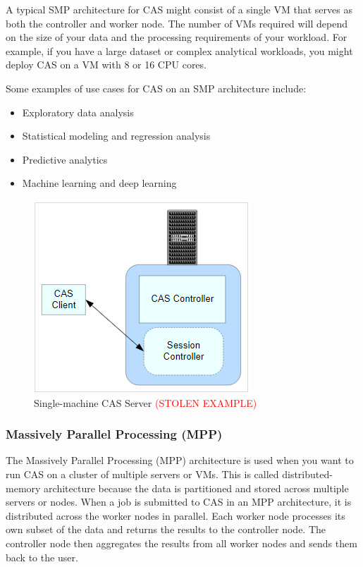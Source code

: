 A typical SMP architecture for CAS might consist of a single VM that serves as both the controller and worker node. The number of VMs required will depend on the size of your data and the processing requirements of your workload. For example, if you have a large dataset or complex analytical workloads, you might deploy CAS on a VM with 8 or 16 CPU cores.

Some examples of use cases for CAS on an SMP architecture include:

\begin{itemize}
    \item Exploratory data analysis
    \item Statistical modeling and regression analysis
    \item Predictive analytics
    \item Machine learning and deep learning
\end{itemize}

\begin{figure}[H]
    \centering
    \includegraphics[scale = 0.8]{images/smp_server.png}
    \caption{Single-machine CAS Server \textcolor{red}{(STOLEN EXAMPLE)} }
    \label{SMP Achitecture}
\end{figure}

\subsubsection{Massively Parallel Processing (MPP)}
The Massively Parallel Processing (MPP) architecture is used when you want to run CAS on a cluster of multiple servers or VMs. This is called distributed-memory architecture because the data is partitioned and stored across multiple servers or nodes. When a job is submitted to CAS in an MPP architecture, it is distributed across the worker nodes in parallel. Each worker node processes its own subset of the data and returns the results to the controller node. The controller node then aggregates the results from all worker nodes and sends them back to the user.

